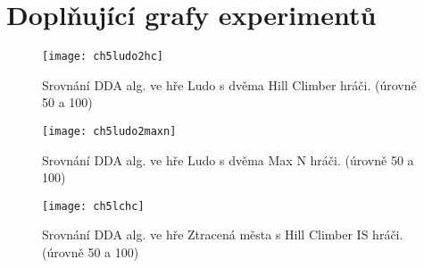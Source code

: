\chapter{Doplňující grafy experimentů}

\begin{figure}
  \centering
  \texttt{[image: ch5ludo2hc]}
	\caption{Srovnání DDA alg. ve hře Ludo s dvěma Hill Climber hráči. (úrovně 50 a 100)}
	\label{fig-ch5ludo2hc}
\end{figure}

\begin{figure}
  \centering
  \texttt{[image: ch5ludo2maxn]}
	\caption{Srovnání DDA alg. ve hře Ludo s dvěma Max N hráči. (úrovně 50 a 100)}
	\label{fig-ch5ludo2maxn}
\end{figure}

\begin{figure}
  \centering
  \texttt{[image: ch5lchc]}
	\caption{Srovnání DDA alg. ve hře Ztracená města s Hill Climber IS hráči. (úrovně 50 a 100) }
	\label{fig-ch5lchc}
\end{figure}


\endinput
